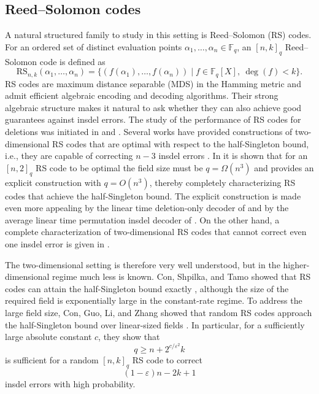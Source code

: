 \documentclass[draft, onecolumn, 11pt]{IEEEtran}
\newcommand{\F}{\mathbb{F}}
\begin{document}
\subsection{Reed--Solomon codes}
A natural structured family to study in this setting is Reed--Solomon (RS) codes. For an ordered set of distinct evaluation points $\alpha_1,\dots,\alpha_n \in \F_q$, an $[n,k]_q$ Reed--Solomon code is defined as
$$\mathrm{RS}_{n,k}(\alpha_1,\dots,\alpha_n)
= \lbrace (f(\alpha_1),\dots,f(\alpha_n)) \mid f \in \F_q[X],\ \deg(f)< k \rbrace.$$
RS codes are maximum distance separable (MDS) in the Hamming metric and admit efficient algebraic encoding and decoding algorithms. Their strong algebraic structure makes it natural to ask whether they can also achieve good guarantees against insdel errors. The study of the performance of RS codes for deletions was initiated in \cite{safavi2002traitor} and \cite{wang2004deletion}. Several works have provided constructions of two-dimensional RS codes that are optimal with respect to the half-Singleton bound, i.e., they are capable of correcting $n-3$ insdel errors \cite{duc2019explicit, liu20212}. In \cite{con2023reed} it is shown that  for an $[n,2]_q$ RS code to be optimal the field size must be $q = \Omega(n^3)$ and \cite{con2023optimal} provides an explicit construction with $q = O(n^3)$, thereby completely characterizing RS codes that achieve the half-Singleton bound. The explicit construction is made even more appealing by the linear time  deletion-only decoder of \cite{singhvi2026decoder} and by the average linear time permutation insdel decoder of \cite{zhang2026perminsdel}. On the other hand, a complete characterization of two-dimensional RS codes that cannot correct even one insdel error is given in \cite{beelen2025fulllengthratehalf}.

The two-dimensional setting is therefore very well understood, but in the higher-dimensional regime much less is known. Con, Shpilka, and Tamo showed that RS codes can attain the half-Singleton bound exactly \cite{con2022explicit}, although the size of the required field is exponentially large in the constant-rate regime. To address the large field size, Con, Guo, Li, and Zhang showed that random RS codes approach the half-Singleton bound over linear-sized fields \cite{con2024randomRS}. In particular, for a sufficiently large absolute constant $c$, they show that
$$q\geq n+2^{c/\varepsilon^2}k$$
is sufficient for a random $[n,k]_q$ RS code to correct
$$(1-\varepsilon)n-2k+1$$
insdel errors with high probability.
\end{document}
